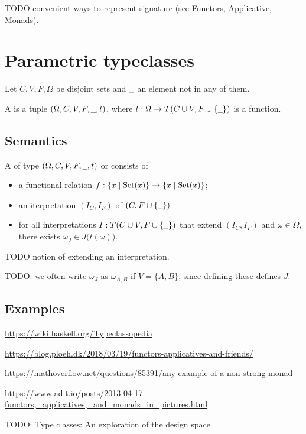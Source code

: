 TODO convenient ways to represent signature (see Functors, Applicative, Monads).

\section{Parametric typeclasses}
\begin{definition}
Let $C,V,F, \Omega$ be disjoint sets and $\mathord{\underline{\hspace{.6em}}}$ an element not in any of them.

A  is a tuple $\sSet{\Omega, C, V, F, \blank,t}$, where $t: \Omega \to T(C\cup V,F\cup\{\mathord{\underline{\hspace{.6em}}}\})$ is a function.
\end{definition}

\subsection{Semantics}
\begin{definition}
A  of type $\sSet{\Omega,C,V,F, \blank,t}$ or  consists of
\begin{itemize}
\item a functional relation $f: \setbuilder{x}{\Set(x)} \to \setbuilder{x}{\Set(x)}$;
\item an iterpretation $(I_C, I_F)$ of $(C,F\cup\{\mathord{\underline{\hspace{.6em}}}\})$
\item for all interpretations $I: T(C\cup V,F\cup\{\mathord{\underline{\hspace{.6em}}}\})$ that extend $(I_C, I_F)$ and $\omega\in \Omega$, there exists $\omega_J \in J\big(t(\omega)\big)$.
\end{itemize}
\end{definition}
TODO notion of extending an interpretation.

TODO: we often write $\omega_J$ as $\omega_{A,B}$ if $V = \{A,B\}$, since defining these defines $J$.

\subsection{Examples}

\url{https://wiki.haskell.org/Typeclassopedia}

\url{https://blog.ploeh.dk/2018/03/19/functors-applicatives-and-friends/}

\url{https://mathoverflow.net/questions/85391/any-example-of-a-non-strong-monad}

\url{https://www.adit.io/posts/2013-04-17-functors,_applicatives,_and_monads_in_pictures.html}

TODO: Type classes: An exploration of the design space

